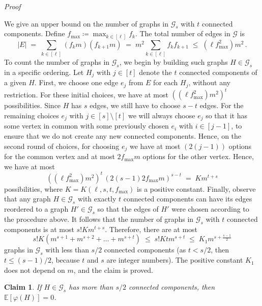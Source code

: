 \documentclass[reqno,a4paper,11pt]{amsart}
\makeatletter
\newcommand{\esp}[1]{\mathbb{E}\left[#1\right]}
\newtheorem{claim}[lemma]{Claim}
\theoremstyle{remark}
\newcommand{\mc}[1]{{\mathcal #1}}
\numberwithin{equation}{section}
\renewenvironment{proof}[1][Proof]{\par
\pushQED{\qed}%
\normalfont \topsep6\p@\@plus6\p@\relax
\trivlist
\item\relax
{\itshape
#1\@addpunct{.}}\hspace\labelsep\ignorespaces
}{%
\popQED\endtrivlist\@endpefalse
}
\makeatother
\begin{document}
\begin{proof}
We give an upper bound on the number of graphs in $\mc G_s$ with $t$ connected
components. Define $f_{\max} \coloneqq \max_{k \in [\ell]} f_k$. The total number of
edges in $\mc G$ is
\begin{equation}
|E| \;=\; \sum_{k \in [\ell]} (f_k m) (f_{k+1} m)
    \;=\; m^2 \sum_{k \in [\ell]} f_k f_{k+1}
    \;\le\; (\ell f_{\max}^2) m^2\,.
\end{equation}
%
To count the number of graphs in $\mc G_s$, we begin by building such graphs $H\in \mc G_s$ in a specific ordering.
Let $H_j$ with $j \in [t]$ denote the $t$ connected components of a given $H$.
First, we choose one edge $e_j$ from $E$ for each $H_j$, without any
restriction. For these initial choices, we have at most
$((\ell f_{\max}^2) m^2)^t$ possibilities. Since $H$ has $s$ edges, we still
have to choose $s-t$ edges. For the remaining choices $e_j$ with
$j \in [s]\setminus [t]$ we will always choose $e_j$ so that it has some
vertex in common with some previously chosen $e_i$ with $i \in [j-1]$, to ensure that we
do not create any new connected components. Hence, on the second round of
choices, for choosing $e_j$ we have at most $(2(j-1))$ options for the
common vertex and at most $2f_{\max} m$ options for the other vertex. Hence,
we have at most
\begin{equation*}
((\ell f_{\max}^2) m^2)^t\,  (2(s-1)  2f_{\max} m)^{s-t}
    \;=\; K m^{t + s}
\end{equation*}
possibilities, where $K = K(\ell, s, t, f_{\max})$ is a positive constant.
Finally, observe that any graph $H\in \mc G_s$ with exactly $t$
connected components can have its edges reordered to a graph $H'\in \mc G_s$
so that the edges of $H'$ were chosen according to the procedure above.
It follows that the number of graphs in $\mc G_s$ with $t$ connected components is at most $s! K m^{t+s}$.
Therefore, there are at most
\begin{equation*}
s! K (m^{s+1}+m^{s+2}+\dots+m^{s+t})
    \;\le\; s! K t m^{s + t}
    \;\le\; {K}_1 m^{s + \frac{s-1}{2}}
\end{equation*}
graphs in $\mc G_s$ with less than $s/2$ connected components (as $t<s/2$, then
$t\le (s-1)/2$, because $t$ and $s$ are integer numbers). The positive constant
${K}_1$ does not depend on $m$, and the claim is proved.
\end{proof}

\begin{claim}
\label{claim:many_components}
If $H \in \mc G_s$ has more than $s/2$ connected components,
then $\esp{\varphi(H)}=0$.
\end{claim}
\end{document}
